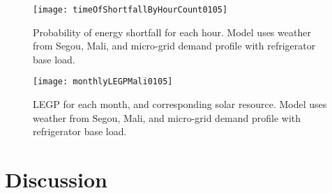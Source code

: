 \documentclass{article}
\begin{document}
\begin{figure}[ht]
\centering
\texttt{[image: timeOfShortfallByHourCount0105]}
\caption{Probability of energy shortfall for each hour. Model uses weather from Segou, Mali, and micro-grid demand profile with refrigerator base load.}
\label{hourlyLEGP}
\end{figure} 


\begin{figure}[ht]
\centering
\texttt{[image: monthlyLEGPMali0105]}
\caption{LEGP for each month, and corresponding solar resource. Model uses weather from Segou, Mali, and micro-grid demand profile with refrigerator base load.}
\label{monthlyLEGP}
\end{figure} 





\section{Discussion}
\end{document}
